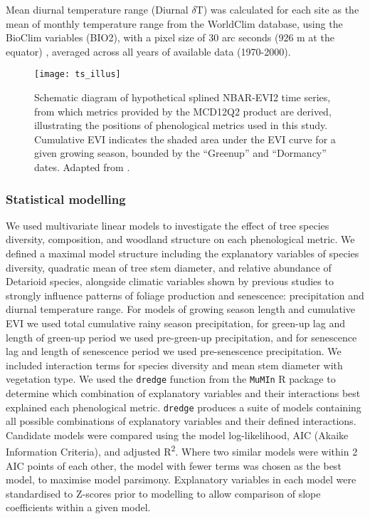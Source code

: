 \documentclass[11pt,a4paper]{article}
\begin{document}
Mean diurnal temperature range (Diurnal $\delta{}$T) was calculated for each site as the mean of monthly temperature range from the WorldClim database, using the BioClim variables (BIO2), with a pixel size of 30 arc seconds (926 m at the equator) \citep{Fick2017}, averaged across all years of available data (1970-2000).

\begin{figure}[H]
\centering
	\texttt{[image: ts\_illus]}
	\caption{Schematic diagram of hypothetical splined NBAR-EVI2 time series, from which metrics provided by the MCD12Q2 product are derived, illustrating the positions of phenological metrics used in this study. Cumulative EVI indicates the shaded area under the EVI curve for a given growing season, bounded by the ``Greenup'' and ``Dormancy'' dates. Adapted from \citep{Gray2022}.}
	\label{ts_illus}
\end{figure}

\subsubsection{Statistical modelling}

We used multivariate linear models to investigate the effect of tree species diversity, composition, and woodland structure on each phenological metric. We defined a maximal model structure including the explanatory variables of species diversity, quadratic mean of tree stem diameter, and relative abundance of Detarioid species, alongside climatic variables shown by previous studies to strongly influence patterns of foliage production and senescence: precipitation and diurnal temperature range. For models of growing season length and cumulative EVI we used total cumulative rainy season precipitation, for green-up lag and length of green-up period we used pre-green-up precipitation, and for senescence lag and length of senescence period we used pre-senescence precipitation. We included interaction terms for species diversity and mean stem diameter with vegetation type. We used the \texttt{dredge} function from the \texttt{MuMIn} R package to determine which combination of explanatory variables and their interactions best explained each phenological metric. \texttt{dredge} produces a suite of models containing all possible combinations of explanatory variables and their defined interactions. Candidate models were compared using the model log-likelihood, AIC (Akaike Information Criteria), and adjusted R\textsuperscript{2}. Where two similar models were within 2 AIC points of each other, the model with fewer terms was chosen as the best model, to maximise model parsimony. Explanatory variables in each model were standardised to Z-scores prior to modelling to allow comparison of slope coefficients within a given model.
\end{document}
